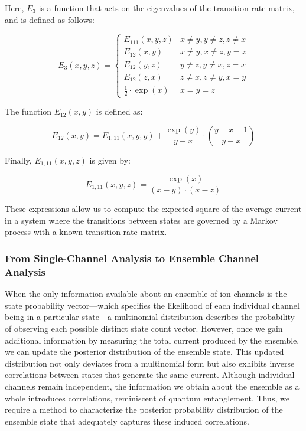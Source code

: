 \documentclass[pdflatex,sn-mathphys-num]{sn-jnl}%
\theoremstyle{thmstyleone}%
\theoremstyle{thmstyletwo}%
\theoremstyle{thmstylethree}%
\begin{document}
Here, \(E_3\) is a function that acts on the eigenvalues of the transition rate matrix, and is defined as follows:

\begin{equation}
	E_3(x,y,z)= 
	\begin{cases}
		E_{111}(x,y,z) & x\neq y, y\neq z, z\neq x \\
		E_{12}(x,y) & x\neq y, x\neq z, y = z \\
		E_{12}(y,z) & y\neq z, y\neq x, z = x \\
		E_{12}(z,x) & z\neq x, z\neq y, x = y \\
		\frac{1}{2} \cdot \exp(x) & x=y=z
	\end{cases}
	\label{eq:E_3}
\end{equation}

The function \(E_{12}(x, y)\) is defined as:

\begin{equation}
	E_{12}(x,y) = E_{1,11}(x, y, y) + \frac{\exp(y)}{y - x} \cdot \left(\frac{y - x - 1}{y - x}\right)
	\label{eq:E_12}
\end{equation}

Finally, \(E_{1,11}(x, y, z)\) is given by:

\begin{equation}
	E_{1,11}(x, y, z) = \frac{\exp(x)}{(x - y) \cdot (x - z)}
	\label{eq:E_1_11}
\end{equation}

These expressions allow us to compute the expected square of the average current in a system where the transitions between states are governed by a Markov process with a known transition rate matrix.






\subsubsection{From Single-Channel Analysis to Ensemble Channel Analysis}

When the only information available about an ensemble of ion channels is the state probability vector—which specifies the likelihood of each individual channel being in a particular state—a multinomial distribution describes the probability of observing each possible distinct state count vector. However, once we gain additional information by measuring the total current produced by the ensemble, we can update the posterior distribution of the ensemble state. This updated distribution not only deviates from a multinomial form but also exhibits inverse correlations between states that generate the same current. Although individual channels remain independent, the information we obtain about the ensemble as a whole introduces correlations, reminiscent of quantum entanglement. Thus, we require a method to characterize the posterior probability distribution of the ensemble state that adequately captures these induced correlations.
\end{document}
